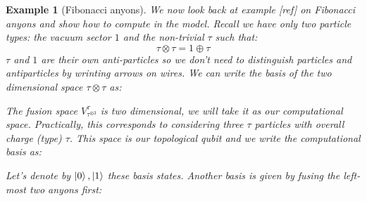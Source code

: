 \documentclass{article}
\newtheorem{example}{Example}
\begin{document}
\begin{example}[Fibonacci anyons]
	We now look back at example [ref] on Fibonacci anyons and show how to compute in the model.
	Recall we have only two particle types: the vacuum sector $1$ and the non-trivial $\tau$ such that:
	$$\tau \otimes \tau = 1 \oplus \tau$$
	$\tau$ and $1$ are their own anti-particles so we don't need to distinguish particles and antiparticles by wrinting arrows on wires.
	We can write the basis of the two dimensional space $\tau \otimes \tau$ as:
	\begin{center}
		\quad
	\end{center}
	The fusion space $V_{\tau^{\otimes 3}}^\tau$ is two dimensional, we will take it as our computational space. Practically, this corresponds to considering three $\tau$ particles with overall charge (type) $\tau$. This space is our topological qubit and we write the computational basis as:
	\begin{center}
		\quad
	\end{center}
	Let's denote by $\ket{0}, \ket{1}$ these basis states. Another basis is given by fusing the left-most two anyons first:
	\begin{center}

\end{center}
\end{example}
\end{document}
